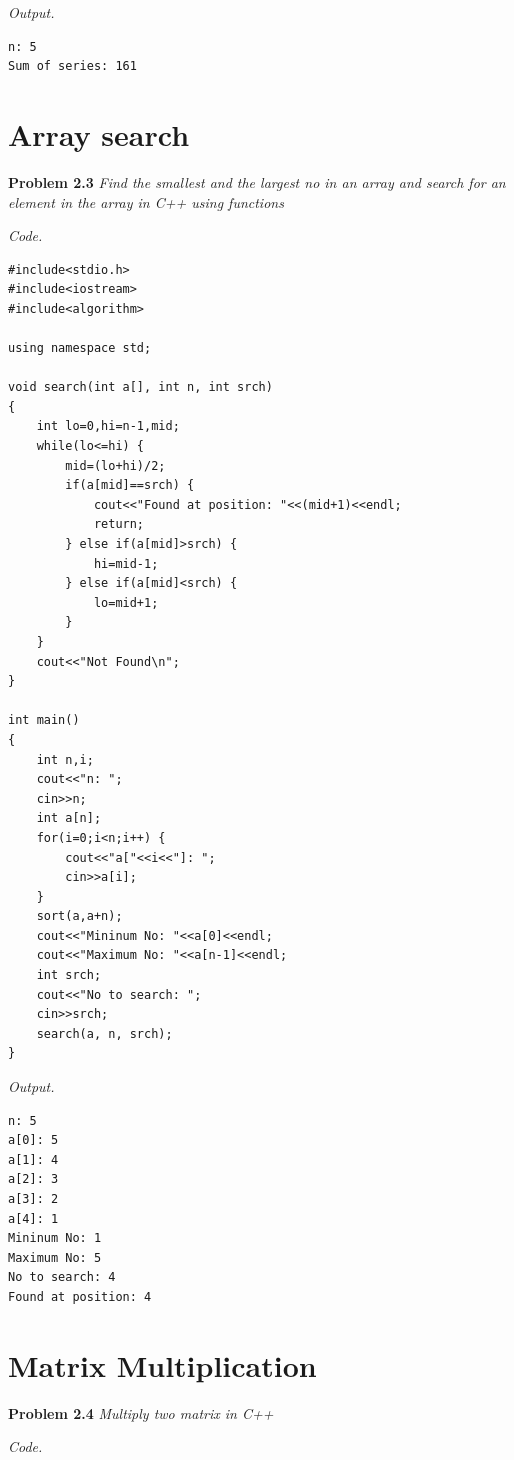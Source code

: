 \documentclass[12pt]{article}
\begin{document}
\textit{Output.}

\begin{lstlisting}
n: 5
Sum of series: 161
\end{lstlisting}

\section{Array search}

\textbf{Problem 2.3} \textit{Find the smallest and the largest no in an array and search for an element in the array in C++ using functions}

\textit{Code.}

\begin{lstlisting}
#include<stdio.h>
#include<iostream>
#include<algorithm>

using namespace std;

void search(int a[], int n, int srch)
{
	int lo=0,hi=n-1,mid;
	while(lo<=hi) {
		mid=(lo+hi)/2;
		if(a[mid]==srch) {
			cout<<"Found at position: "<<(mid+1)<<endl;
			return;
		} else if(a[mid]>srch) {
			hi=mid-1;
		} else if(a[mid]<srch) {
			lo=mid+1;
		}
	}
	cout<<"Not Found\n";
}

int main()
{
	int n,i;
	cout<<"n: ";
	cin>>n;
	int a[n];
	for(i=0;i<n;i++) {
		cout<<"a["<<i<<"]: ";
		cin>>a[i];
	}
	sort(a,a+n);
	cout<<"Mininum No: "<<a[0]<<endl;
	cout<<"Maximum No: "<<a[n-1]<<endl;
	int srch;
	cout<<"No to search: ";
	cin>>srch;
	search(a, n, srch);
}
\end{lstlisting}

\textit{Output.}

\begin{lstlisting}
n: 5
a[0]: 5
a[1]: 4
a[2]: 3
a[3]: 2
a[4]: 1
Mininum No: 1
Maximum No: 5
No to search: 4
Found at position: 4
\end{lstlisting}


\section{Matrix Multiplication}

\textbf{Problem 2.4} \textit{Multiply two matrix in C++}

\textit{Code.}
\end{document}
